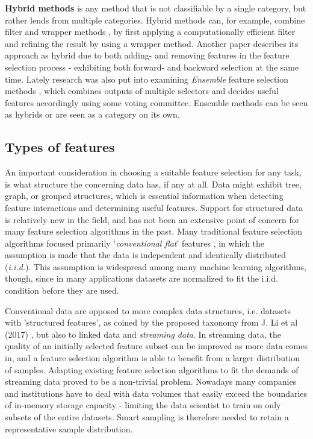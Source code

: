 \documentclass{article}
\begin{document}
\textbf{Hybrid methods} is any method that is not classifiable by a single category, but rather lends from multiple categories. Hybrid methods can, for example, combine filter and wrapper methods \citep{hsu2011hybrid}, by first applying a computationally efficient filter and refining the result by using a wrapper method. Another paper \citep{das2001filters} describes its approach as hybrid due to both adding- and removing features in the feature selection process - exhibiting both forward- and backward selection at the same time. Lately research was also put into examining \textit{Ensemble} feature selection methods \citep{bolon2019ensembles}, which combines outputs of multiple selectors and decides useful features accordingly using some voting committee. Ensemble methods can be seen as hybrids or are seen as a category on its own.

\subsection{Types of features}
An important consideration in choosing a suitable feature selection for any task, is what structure the concerning data has, if any at all. Data might exhibit tree, graph, or grouped structures, which is essential information when detecting feature interactions and determining useful features. Support for structured data is relatively new in the field, and has not been an extensive point of concern for many feature selection algorithms in the past. Many traditional feature selection algorithms focused primarily '\textit{conventional flat}' features \citep{li2017feature}, in which the assumption is made that the data is independent and identically distributed (\textit{i.i.d.}). This assumption is widespread among many machine learning algorithms, though, since in many applications datasets are normalized to fit the i.i.d. condition before they are used.

Conventional data are opposed to more complex data structures, i.e. datasets with 'structured features', as coined by the proposed taxonomy from J. Li et al (2017) \cite{li2017feature}, but also to linked data and \textit{streaming data}. In streaming data, the quality of an initially selected feature subset can be improved as more data comes in, and a feature selection algorithm is able to benefit from a larger distribution of samples. Adapting existing feature selection algorithms to fit the demands of streaming data proved to be a non-trivial problem. Nowadays many companies and institutions have to deal with data volumes that easily exceed the boundaries of in-memory storage capacity - limiting the data scientist to train on only subsets of the entire datasets. Smart sampling is therefore needed to retain a representative sample distribution.
\end{document}
